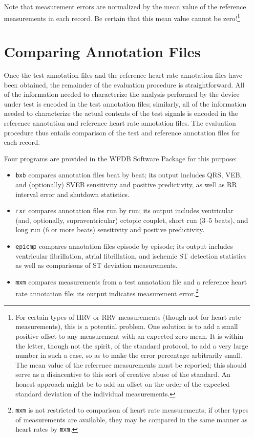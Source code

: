 \documentclass[twoside]{article}
\begin{document}
Note that measurement errors are normalized by the mean value of the reference
measurements in each record.  Be certain that this mean value cannot be
zero!\footnote{
For certain types of HRV or RRV measurements (though not for heart rate
measurements), this is a potential problem.  One solution is to add a small
positive offset to any measurement with an expected zero mean.  It is within
the letter, though not the spirit, of the standard protocol, to add a
very large number in such a case, so as to make the error percentage
arbitrarily small.  The mean value of the reference measurements must be
reported; this should serve as a disincentive to this sort of creative abuse
of the standard.  An honest approach might be to add an offset on the order of
the expected standard deviation of the individual measurements.}

\section{Comparing Annotation Files}

Once the test annotation files and the reference heart rate annotation files
have been obtained, the remainder of the evaluation procedure is
straightforward.  All of the information needed to characterize the analysis
performed by the device under test is encoded in the test annotation files;
similarly, all of the information needed to characterize the actual contents
of the test signals is encoded in the reference annotation and reference
heart rate annotation files.  The evaluation procedure thus entails comparison
of the test and reference annotation files for each record.

Four programs are provided in the WFDB Software Package for this purpose:
\begin{itemize}
   \item {\tt bxb} compares annotation files beat by beat; its output
includes QRS, VEB, and (optionally) SVEB sensitivity and positive
predictivity, as well as RR interval error and shutdown statistics.

   \item {\tt rxr} compares annotation files run by run; its output
includes ventricular (and, optionally, supraventricular) ectopic couplet, short
run (3--5 beats), and long run (6 or more beats) sensitivity and positive
predictivity.

   \item {\tt epicmp} compares annotation files episode by episode; its
output includes ventricular fibrillation, atrial fibrillation, and ischemic ST
detection statistics as well as comparisons of ST deviation measurements.

   \item {\tt mxm} compares measurements from a test annotation
file and a reference heart rate annotation file;  its output indicates
measurement error.\footnote{
{\tt mxm} is not restricted to comparison of heart rate measurements;  if
other types of measurements are available, they may be compared in the same
manner as heart rates by {\tt mxm}.}
\end{itemize}
\end{document}
